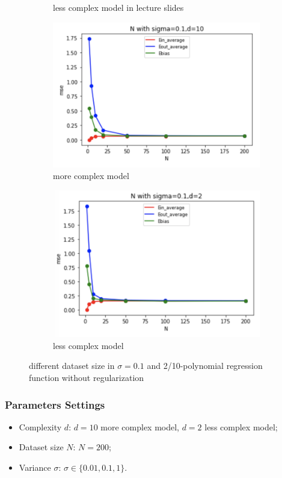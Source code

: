 \documentclass[12pt,letterpaper]{article}
\begin{document}
\begin{figure}[h]
\begin{subfigure}{.45\textwidth}
  \caption{\small less complex model in lecture slides}
  \label{fig:sub2}
\end{subfigure}
\begin{subfigure}{.45\textwidth}
  \centering
  \includegraphics[width=.9\linewidth]{lzsig01d10.png}
  \caption{\small more complex model}
  \label{fig:sub3}
\end{subfigure}
\begin{subfigure}{.45\textwidth}
  \centering
  \includegraphics[width=.9\linewidth]{lzsig01d2.png}
  \caption{\small less complex model}
  \label{fig:sub4}
\end{subfigure}
\caption{\small different dataset size in $\sigma=0.1$ and 2/10-polynomial regression function without regularization}
\label{fig:sig01d2/10}
\end{figure}

\subsubsection*{Parameters Settings}
\begin{itemize}
    \item Complexity $d$: $d = 10$ more complex model, $d = 2$ less complex model;
    \item Dataset size $N$: $N = 200$;
    \item Variance $\sigma$: $\sigma \in \{ 0.01, 0.1, 1 \}$.
\end{itemize}
\end{document}
